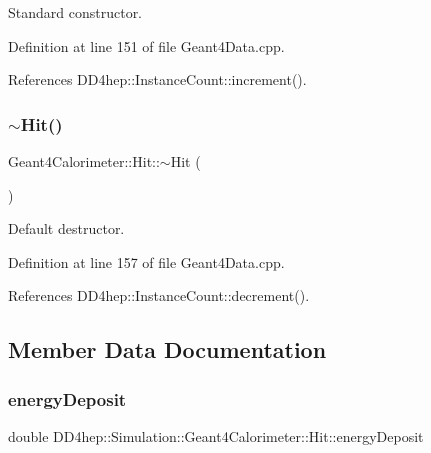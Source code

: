 Standard constructor. 



Definition at line 151 of file Geant4\+Data.\+cpp.



References D\+D4hep\+::\+Instance\+Count\+::increment().

\hypertarget{class_d_d4hep_1_1_simulation_1_1_geant4_calorimeter_1_1_hit_a57de79fef476cc5fb8564e1b712d0aad}{}\label{class_d_d4hep_1_1_simulation_1_1_geant4_calorimeter_1_1_hit_a57de79fef476cc5fb8564e1b712d0aad} 
\subsubsection{\texorpdfstring{$\sim$\+Hit()}{~Hit()}}
{\footnotesize\ttfamily Geant4\+Calorimeter\+::\+Hit\+::$\sim$\+Hit (\begin{DoxyParamCaption}{ }\end{DoxyParamCaption})\hspace{0.3cm}{\ttfamily [virtual]}}



Default destructor. 



Definition at line 157 of file Geant4\+Data.\+cpp.



References D\+D4hep\+::\+Instance\+Count\+::decrement().



\subsection{Member Data Documentation}
\hypertarget{class_d_d4hep_1_1_simulation_1_1_geant4_calorimeter_1_1_hit_a5d9a6b22529494a8b8e4a9f3f8df9162}{}\label{class_d_d4hep_1_1_simulation_1_1_geant4_calorimeter_1_1_hit_a5d9a6b22529494a8b8e4a9f3f8df9162} 
\subsubsection{\texorpdfstring{energy\+Deposit}{energyDeposit}}
{\footnotesize\ttfamily double D\+D4hep\+::\+Simulation\+::\+Geant4\+Calorimeter\+::\+Hit\+::energy\+Deposit}



